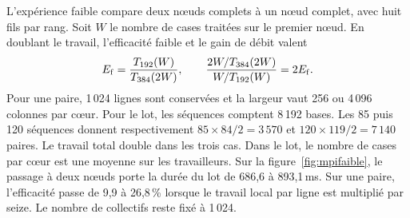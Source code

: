L'expérience faible compare deux nœuds complets à un nœud complet, avec huit fils par rang. Soit \(W\) le nombre de cases traitées sur le premier nœud. En doublant le travail, l'efficacité faible et le gain de débit valent
\[
 E_{\rm f}=\frac{T_{192}(W)}{T_{384}(2W)},\qquad
 \frac{2W/T_{384}(2W)}{W/T_{192}(W)}=2E_{\rm f}.
\]
Pour une paire, 1\,024 lignes sont conservées et la largeur vaut 256 ou 4\,096 colonnes par cœur. Pour le lot, les séquences comptent 8\,192 bases. Les 85 puis 120 séquences donnent respectivement \(85\times84/2=3\,570\) et \(120\times119/2=7\,140\) paires. Le travail total double dans les trois cas. Dans le lot, le nombre de cases par cœur est une moyenne sur les travailleurs.
Sur la figure~\ref{fig:mpifaible}, le passage à deux nœuds porte la durée du lot de 686,6 à 893,1\,ms. Sur une paire, l'efficacité passe de 9,9 à 26,8\,\% lorsque le travail local par ligne est multiplié par seize. Le nombre de collectifs reste fixé à 1\,024.
